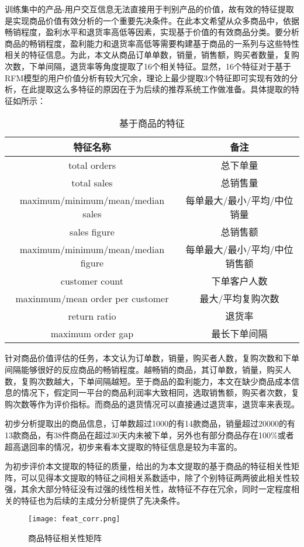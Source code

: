 \documentclass[lang=cn,11pt,a4paper,cite=authoryear]{elegantpaper}
\begin{document}
训练集中的产品-用户交互信息无法直接用于判别产品的价值，故有效的特征提取是实现商品价值有效分析的一个重要先决条件。在此本文希望从众多商品中，依据畅销程度，盈利水平和退货率高低等因素，实现基于价值的有效商品分类。要分析商品的畅销程度，盈利能力和退货率高低等需要构建基于商品的一系列与这些特性相关的特征信息。为此，本文从商品订单单数，销量，销售额，购买者数量，复购次数，下单间隔，退货率等角度提取了16个相关特征。显然，16个特征对于基于RFM模型的用户价值分析有较大冗余，理论上最少提取3个特征即可实现有效的分析，在此提取这么多特征的原因在于为后续的推荐系统工作做准备。具体提取的特征如所示：
\begin{table}[!htb]
  \centering
  \caption{基于商品的特征}
    \huge
    \begin{tabular}{c|c}
    \hline
    \textbf{特征名称} & \textbf{备注} \\
    \hline
    total orders  & 总下单量 \\
    total sales    & 总销售量 \\
    maximum/minimum/mean/median sales & 每单最大/最小/平均/中位销量  \\
    sales figure   & 总销售额 \\
    maximum/minimum/mean/median figure & 每单最大/最小/平均/中位销售额 \\
    customer count & 下单客户人数 \\
    maxinmum/mean order per customer & 最大/平均复购次数 \\
    return ratio & 退货率 \\
    maximum order gap & 最长下单间隔 \\
    \hline
    \end{tabular}
  \label{基于商品的特征}
\end{table}

针对商品价值评估的任务，本文认为订单数，销量，购买者人数，复购次数和下单间隔能够很好的反应商品的畅销程度。越畅销的商品，其订单数，销量，购买人数，复购次数越大，下单间隔越短。至于商品的盈利能力，本文在缺少商品成本信息的情况下，假定同一平台的商品利润率大致相同，选取销售额，购买者次数，复购次数等作为评价指标。而商品的退货情况可以直接通过退货率，退货率来表现。

初步分析提取出的商品信息，订单数超过1000的有14款商品，销量超过20000的有13款商品，有38件商品在超过30天内未被下单，另外也有部分商品存在100\%或者超高退回率的情况，初步来看本文提取的特征信息是较为丰富的。

为初步评价本文提取的特征的质量，给出的为本文提取的基于商品的特征相关性矩阵，可以见得本文提取的特征之间相关系数适中，除了个别特征两两彼此相关性较强，其余大部分特征没有过强的线性相关性，故特征不存在冗余，同时一定程度相关的特征也为后续的主成分分析提供了先决条件。
\begin{figure}[H]
  \centering
  \texttt{[image: feat\_corr.png]}
  \caption{商品特征相关性矩阵}
  \label{商品特征相关性矩阵}
\end{figure}
\end{document}
